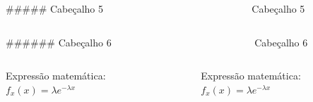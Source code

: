 \documentclass[
]{book}
\begin{document}
\begin{columns}

\begin{column}

\#\#\#\#\# Cabeçalho 5

\end{column}

\begin{column}

~

\end{column}

\begin{column}

\hypertarget{cabeuxe7alho-5}{}
\begin{section}

Cabeçalho 5

\end{section}

\end{column}

\end{columns}

\begin{columns}

\begin{column}

\#\#\#\#\#\# Cabeçalho 6

\end{column}

\begin{column}

~

\end{column}

\begin{column}

\hypertarget{cabeuxe7alho-6}{}
\begin{section}

Cabeçalho 6

\end{section}

\end{column}

\end{columns}

\begin{columns}

\begin{column}

Expressão matemática:
\(f_x(x) = \lambda e^{- \lambda x}\)

\end{column}

\begin{column}

~

\end{column}

\begin{column}

Expressão matemática: {\(f_x(x) = \lambda e^{- \lambda x}\)}

\end{column}

\end{columns}
\end{document}
